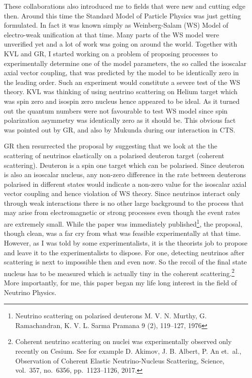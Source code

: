 These collaborations also introduced me to fields that were new and cutting edge then. Around this time the Standard Model of Particle Physics was just getting formulated. In fact it was known simply as Weinberg-Salam (WS) Model of electro-weak unification at that time. Many parts of the WS model were unverified yet and a lot of work was going on around the world. Together with KVL and GR, I started working on a problem of proposing processes to experimentally determine one of the model parameters, the so called the isoscalar axial vector coupling, that was predicted by the model to be identically zero in the leading order. Such an experiment would constitute a severe test of the WS theory. KVL was thinking of using neutrino scattering on Helium target which was spin zero and isospin zero nucleus hence appeared to be ideal. As it turned out the quantum numbers were not favourable to test WS model since spin polarization asymmetry was identically zero as it should be. This obvious fact was pointed out by GR, and also by Mukunda during our interaction in CTS.

GR then resurrected the proposal by suggesting that we look at the the scattering of neutrinos elastically on a polarised deuteron target (coherent scattering). Deuteron is a spin one target which can be polarised. Since deuteron is also an isoscalar nucleus, any non-zero difference in the rate between deuterons polarised in different states would indicate a non-zero value for the isoscalar axial vector coupling and hence violation of WS theory. Since neutrinos interact only through weak interactions there is no other large background to the process that may arise from electromagnetic or strong processes even though the event rates are extremely small. While the paper was immediately published\footnote{Neutrino scattering on polarised deuterons M. V. N. Murthy, G. Ramachandran, K. V. L. Sarma Pramana 9 (2), 119--127, 1976}, the proposal, though clean, was a far cry from what was feasible experimentally at that time. However, as I was told by some experimentalists, it is the theorists job to propose and leave it to the experimentalists to dispose. For one, detecting neutrinos after scattering is next to impossible then and even now. So the recoil of the final state nucleus has to be measured which is actually tiny in the coherent scattering.\footnote{Coherent neutrino scattering on nuclei was experimentally observed only recently on Cesium. See for example D. Akimov, J. B. Albert, P. An et.\ al., Observation of Coherent Elastic Neutrino-Nucleus Scattering, Science, vol.\ 357, no.\ 6356, pp.\ 1123--1126, 2017.} More importantly, for me, this paper began my life long interest in the field of Neutrino Physics.

